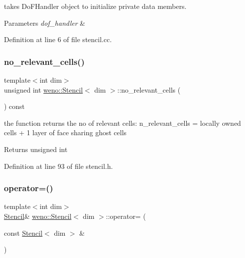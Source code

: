 takes Do\+F\+Handler object to initialize private data members. 


\begin{DoxyParams}{Parameters}
{\em dof\+\_\+handler} & \\
\hline
\end{DoxyParams}


Definition at line 6 of file stencil.\+cc.

\mbox{\label{classweno_1_1_stencil_a094f79cdf961bfcab7ff7af5d5faf204}} 
\subsubsection{\texorpdfstring{no\+\_\+relevant\+\_\+cells()}{no\_relevant\_cells()}}
{\footnotesize\ttfamily template$<$int dim$>$ \\
unsigned int \hyperlink{classweno_1_1_stencil}{weno\+::\+Stencil}$<$ dim $>$\+::no\+\_\+relevant\+\_\+cells (\begin{DoxyParamCaption}{ }\end{DoxyParamCaption}) const\hspace{0.3cm}{\ttfamily [inline]}}



the function returns the no of relevant cells\+: n\+\_\+relevant\+\_\+cells = locally owned cells + 1 layer of face sharing ghost cells 

\begin{DoxyReturn}{Returns}
unsigned int 
\end{DoxyReturn}


Definition at line 93 of file stencil.\+h.

\mbox{\label{classweno_1_1_stencil_a40e7f2c183bcf383e6075c7111e55ef2}} 
\subsubsection{\texorpdfstring{operator=()}{operator=()}\hspace{0.1cm}{\footnotesize\ttfamily [1/2]}}
{\footnotesize\ttfamily template$<$int dim$>$ \\
\hyperlink{classweno_1_1_stencil}{Stencil}\& \hyperlink{classweno_1_1_stencil}{weno\+::\+Stencil}$<$ dim $>$\+::operator= (\begin{DoxyParamCaption}\item[{const \hyperlink{classweno_1_1_stencil}{Stencil}$<$ dim $>$ \&}]{ }\end{DoxyParamCaption})\hspace{0.3cm}{\ttfamily [delete]}}



